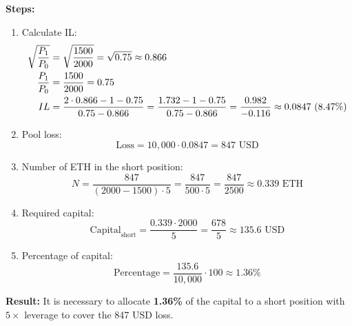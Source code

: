 \documentclass[11pt]{article}
\begin{document}
\textbf{Steps:}
\begin{enumerate}
    \item Calculate IL:
    \begin{align}
    \sqrt{\frac{P_1}{P_0}} &= \sqrt{\frac{1500}{2000}} = \sqrt{0.75} \approx 0.866 \notag \\
    \frac{P_1}{P_0} &= \frac{1500}{2000} = 0.75 \notag \\
    IL &= \frac{2 \cdot 0.866 - 1 - 0.75}{0.75 - 0.866} = \frac{1.732 - 1 - 0.75}{0.75 - 0.866} = \frac{0.982}{-0.116} \approx 0.0847 \ (8.47\%) \notag
    \end{align}
    \item Pool loss:
    \begin{equation}
    \text{Loss} = 10,000 \cdot 0.0847 = 847 \text{ USD}
    \end{equation}
    \item Number of ETH in the short position:
    \begin{equation}
    N = \frac{847}{(2000 - 1500) \cdot 5} = \frac{847}{500 \cdot 5} = \frac{847}{2500} \approx 0.339 \text{ ETH}
    \end{equation}
    \item Required capital:
    \begin{equation}
    \text{Capital}_{\text{short}} = \frac{0.339 \cdot 2000}{5} = \frac{678}{5} \approx 135.6 \text{ USD}
    \end{equation}
    \item Percentage of capital:
    \begin{equation}
    \text{Percentage} = \frac{135.6}{10,000} \cdot 100 \approx 1.36\%
    \end{equation}
\end{enumerate}

\textbf{Result:} It is necessary to allocate \textbf{1.36\%} of the capital to a short position with \(5\times\) leverage to cover the 847 USD loss.
\end{document}

